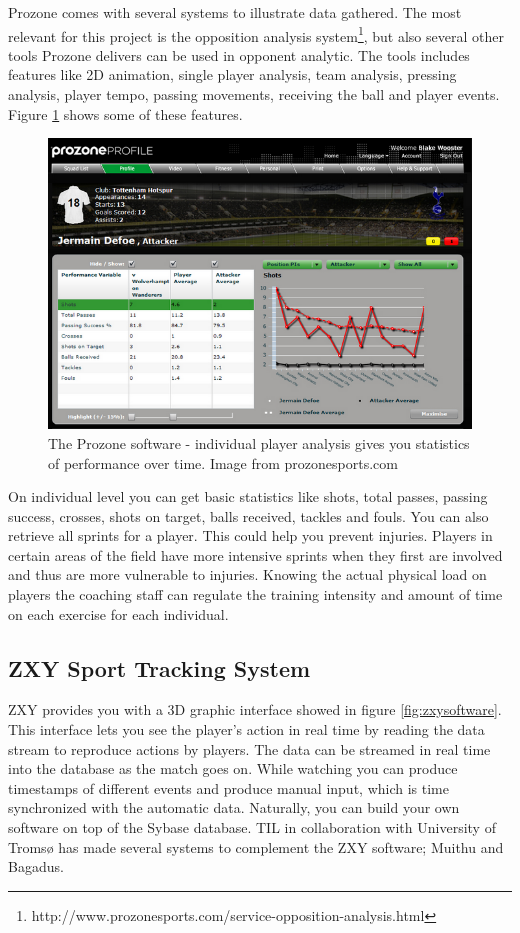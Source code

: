 Prozone comes with several systems to illustrate data gathered. The most relevant for this project is the opposition analysis system\footnote{http://www.prozonesports.com/service-opposition-analysis.html}, but also several other tools Prozone delivers can be used in opponent analytic. The tools includes features like 2D animation, single player analysis, team analysis, pressing analysis, player tempo, passing movements, receiving the ball and player events. Figure \ref{fig:prozone} shows some of these features.

\begin{figure}[ht!]
\centering
\includegraphics[width=1\textwidth]{images/general/prozonestats.png}
\caption{The Prozone software - individual player analysis gives you statistics of performance over time. Image from prozonesports.com}
\label{fig:prozone}
\end{figure}

On individual level you can get basic statistics like shots, total passes, passing success, crosses, shots on target, balls received, tackles and fouls. 
You can also retrieve all sprints for a player. This could help you prevent injuries. Players in certain areas of the field have more intensive sprints when they first are involved and thus are more vulnerable to injuries. Knowing the actual physical load on players the coaching staff can regulate the training intensity and amount of time on each exercise for each individual.

\subsection{ZXY Sport Tracking System}
ZXY provides you with a 3D graphic interface showed in figure \ref{fig:zxysoftware}. This interface lets you see the player’s action in real time by reading the data stream to reproduce actions by players. The data can be streamed in real time into the database as the match goes on. While watching you can produce timestamps of different events and produce manual input, which is time synchronized with the automatic data. Naturally, you can build your own software on top of the Sybase database. \ac{TIL} in collaboration with University of Troms{\o} has made several systems to complement the ZXY software; Muithu\cite{muithu} and Bagadus\cite{Saegrov2012}.

